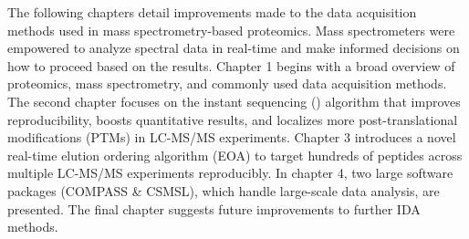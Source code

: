 The following chapters detail improvements made to the data acquisition methods used in mass spectrometry-based proteomics. Mass spectrometers were empowered to analyze spectral data in real-time and make informed decisions on how to proceed based on the results. Chapter 1 begins with a broad overview of proteomics, mass spectrometry, and commonly used data acquisition methods. The second chapter focuses on the instant sequencing (\inseq{}) algorithm that improves reproducibility, boosts quantitative results, and localizes more post-translational modifications (PTMs) in LC-MS/MS experiments. Chapter 3 introduces a novel real-time elution ordering algorithm (EOA) to target hundreds of peptides across multiple LC-MS/MS experiments reproducibly. In chapter 4, two large software packages (COMPASS \& CSMSL), which handle large-scale data analysis, are presented. The final chapter suggests future improvements to further IDA methods.